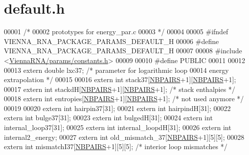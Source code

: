 \hypertarget{default_8h_source}{}\section{default.\+h}
\label{default_8h_source}

\begin{DoxyCode}
00001 \textcolor{comment}{/*}
00002 \textcolor{comment}{   prototypes for energy\_par.c}
00003 \textcolor{comment}{*/}
00004 
00005 \textcolor{preprocessor}{#ifndef VIENNA\_RNA\_PACKAGE\_PARAMS\_DEFAULT\_H}
00006 \textcolor{preprocessor}{#define VIENNA\_RNA\_PACKAGE\_PARAMS\_DEFAULT\_H}
00007 
00008 \textcolor{preprocessor}{#include <\hyperlink{constants_8h}{ViennaRNA/params/constants.h}>}
00009 
00010 \textcolor{preprocessor}{#define PUBLIC}
00011 
00012 
00013 \textcolor{keyword}{extern} \textcolor{keywordtype}{double} lxc37;   \textcolor{comment}{/* parameter for logarithmic loop}
00014 \textcolor{comment}{        energy extrapolation            */}
00015 
00016 \textcolor{keyword}{extern} \textcolor{keywordtype}{int} stack37[\hyperlink{constants_8h_a5e75221c779d618eab81e096f37e32ce}{NBPAIRS}+1][\hyperlink{constants_8h_a5e75221c779d618eab81e096f37e32ce}{NBPAIRS}+1];
00017 \textcolor{keyword}{extern} \textcolor{keywordtype}{int} stackdH[\hyperlink{constants_8h_a5e75221c779d618eab81e096f37e32ce}{NBPAIRS}+1][\hyperlink{constants_8h_a5e75221c779d618eab81e096f37e32ce}{NBPAIRS}+1]; \textcolor{comment}{/* stack enthalpies */}
00018 \textcolor{keyword}{extern} \textcolor{keywordtype}{int} entropies[\hyperlink{constants_8h_a5e75221c779d618eab81e096f37e32ce}{NBPAIRS}+1][\hyperlink{constants_8h_a5e75221c779d618eab81e096f37e32ce}{NBPAIRS}+1];  \textcolor{comment}{/* not used anymore */}
00019 
00020 \textcolor{keyword}{extern} \textcolor{keywordtype}{int} hairpin37[31];
00021 \textcolor{keyword}{extern} \textcolor{keywordtype}{int} hairpindH[31];
00022 \textcolor{keyword}{extern} \textcolor{keywordtype}{int} bulge37[31];
00023 \textcolor{keyword}{extern} \textcolor{keywordtype}{int} bulgedH[31];
00024 \textcolor{keyword}{extern} \textcolor{keywordtype}{int} internal\_loop37[31];
00025 \textcolor{keyword}{extern} \textcolor{keywordtype}{int} internal\_loopdH[31];
00026 \textcolor{keyword}{extern} \textcolor{keywordtype}{int} internal2\_energy;
00027 \textcolor{keyword}{extern} \textcolor{keywordtype}{int} old\_mismatch\_37[\hyperlink{constants_8h_a5e75221c779d618eab81e096f37e32ce}{NBPAIRS}+1][5][5];
00028 \textcolor{keyword}{extern} \textcolor{keywordtype}{int} mismatchI37[\hyperlink{constants_8h_a5e75221c779d618eab81e096f37e32ce}{NBPAIRS}+1][5][5];  \textcolor{comment}{/* interior loop mismatches */}

\end{DoxyCode}
